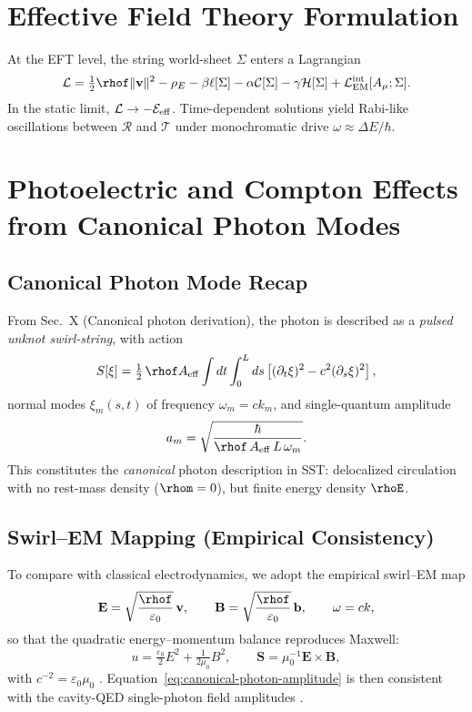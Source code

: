 \documentclass[11pt,a4paper]{article}
\begin{document}
\section{Effective Field Theory Formulation}

At the EFT level, the string world-sheet $\Sigma$ enters a Lagrangian
\begin{equation}
\mathcal L = \tfrac12 \rhof \|\mathbf v\|^2 - \rho_E
- \beta \ell[\Sigma] - \alpha \mathcal C[\Sigma]
- \gamma \mathcal H[\Sigma] + \mathcal L_{\rm EM}^{\rm int}[A_\mu;\Sigma].
\end{equation}
In the static limit, $\mathcal L \to -\mathcal E_{\rm eff}$.
Time-dependent solutions yield Rabi-like oscillations between $\mathcal R$ and $\mathcal T$ 
under monochromatic drive $\omega\approx \Delta E/\hbar$.


\section{Photoelectric and Compton Effects from Canonical Photon Modes}

    \subsection{Canonical Photon Mode Recap}
    From Sec.~X (Canonical photon derivation), the photon is described as a
    \emph{pulsed unknot swirl-string}, with action
    \[
    S[\xi] = \tfrac{1}{2}\,\rhof A_{\mathrm{eff}}
    \int dt \int_0^L ds \left[(\partial_t \xi)^2 - c^2 (\partial_s \xi)^2 \right],
    \]
    normal modes $\xi_m(s,t)$ of frequency $\omega_m=c k_m$,
    and single-quantum amplitude
    \begin{equation}
    a_m = \sqrt{\frac{\hbar}{\rhof\,A_{\mathrm{eff}}\,L\,\omega_m}}.
    \label{eq:canonical-photon-amplitude}
    \end{equation}
    This constitutes the \emph{canonical} photon description in SST:
    delocalized circulation with no rest-mass density ($\rhom=0$),
    but finite energy density $\rhoE$.

    \subsection{Swirl--EM Mapping (Empirical Consistency)}
    To compare with classical electrodynamics, we adopt the
    empirical swirl--EM map
    \begin{equation}
    \mathbf{E}=\sqrt{\frac{\rhof}{\varepsilon_0}}\,\mathbf{v},\qquad
    \mathbf{B}=\sqrt{\frac{\rhof}{\varepsilon_0}}\,\mathbf{b},\qquad
    \omega=ck,
    \label{eq:swirl-em-map}
    \end{equation}
    so that the quadratic energy--momentum balance reproduces Maxwell:
    \[
    u=\tfrac{\varepsilon_0}{2}E^2+\tfrac{1}{2\mu_0}B^2,\qquad
    \mathbf{S}=\mu_0^{-1}\mathbf{E}\!\times\!\mathbf{B},
    \]
    with $c^{-2}=\varepsilon_0\mu_0$ \cite{Jackson1999}.
    Equation~\eqref{eq:canonical-photon-amplitude} is then consistent with the
    cavity-QED single-photon field amplitudes \cite{HarocheRaimond2006,ScullyZubairy1997}.
\end{document}
